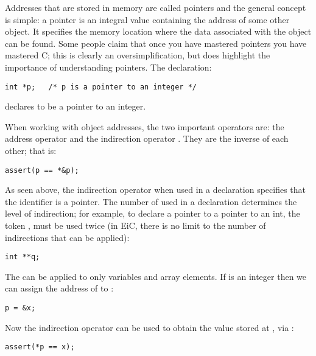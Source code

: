 Addresses that are stored in memory are called pointers and the
general concept is simple: a pointer is an integral value containing
the address of some other object. It specifies the memory location
where the data associated with the object can be found. Some people
claim that once you have mastered pointers you have mastered C; this
is clearly an oversimplification, but does highlight the importance of
understanding pointers. The declaration:
\begin{production}
\begin{verbatim}
int *p;   /* p is a pointer to an integer */

\end{verbatim}
\end{production}
 declares  to be a pointer to an integer. 

When working with object addresses, the two important operators are:
the address operator \T{\&} and the indirection operator \T{*}. They are the
inverse of each other; that is:

\begin{production}
\begin{verbatim}        
assert(p == *&p);
\end{verbatim}
\end{production}

 As seen above, the indirection operator when used in a declaration
specifies that the identifier is a pointer. The number of \T{*} used
in a declaration determines the level of indirection; for example, to
declare a pointer to a pointer to an int, the token \T{*}, must be
used twice (in EiC, there is no limit to the number of indirections
that can be applied):
\begin{production}
\begin{verbatim}
int **q;
\end{verbatim}
\end{production}
 The \T{\&} can be applied to only
variables and array elements. If
 is an integer then we can assign the address of 
to :
\begin{production}
\begin{verbatim}
p = &x;
\end{verbatim}
\end{production}
 Now the indirection operator can be used to obtain the value stored at
, via :
\begin{production}
\begin{verbatim}
assert(*p == x);
\end{verbatim}
\end{production}

